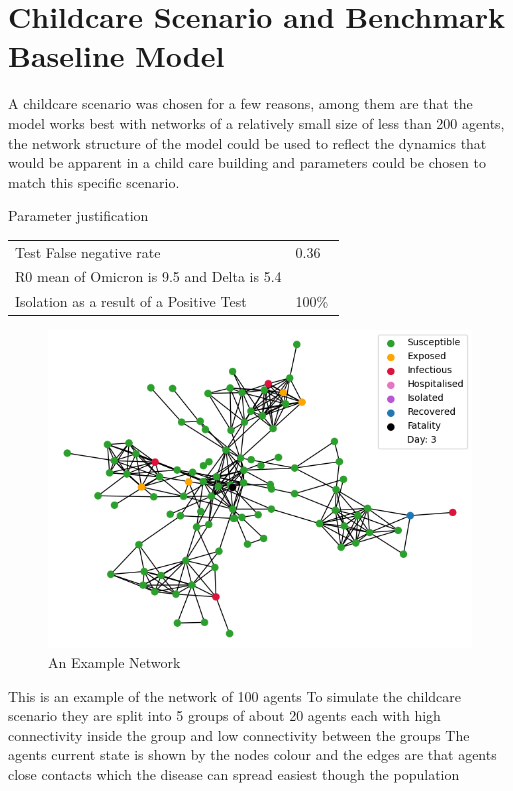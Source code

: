 \documentclass{article}
\begin{document}
\newpage



\newpage
\section{Childcare Scenario and Benchmark Baseline Model}


A childcare scenario was chosen for a few reasons, among them are that the model works best with networks of a relatively small size of less than 200 agents, the network structure of the model could be used to reflect the dynamics that would be apparent in a child care building and parameters could be chosen to match this specific scenario.\newline

Parameter justification

\begin{table}[h!]
\begin{tabular}{ll}
Test False negative rate & 0.36 ~\cite{van_de_mortel_2022} \\
R0 mean of Omicron is 9.5 and Delta is 5.4 & ~\cite{liu_rocklov_2022} \\
Isolation as a result of a Positive Test & 100\%
\end{tabular}
\end{table}

\begin{figure}[h!]
  \centering
      \includegraphics[width=\textwidth]{network}
  \caption{An Example Network}
\end{figure}

This is an example of the network of 100 agents
To simulate the childcare scenario they are split into 5 groups of about 20 agents each with high connectivity inside the group and low connectivity between the groups 
The agents current state is shown by the nodes colour and the edges are that agents close contacts which the disease can spread easiest though the population\newline
\end{document}
